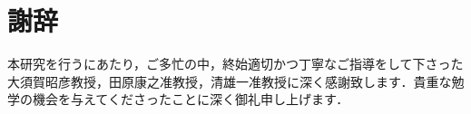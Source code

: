 \section*{謝辞}
本研究を行うにあたり，ご多忙の中，終始適切かつ丁寧なご指導をして下さった大須賀昭彦教授，田原康之准教授，清雄一准教授に深く感謝致します．貴重な勉学の機会を与えてくださったことに深く御礼申し上げます．





